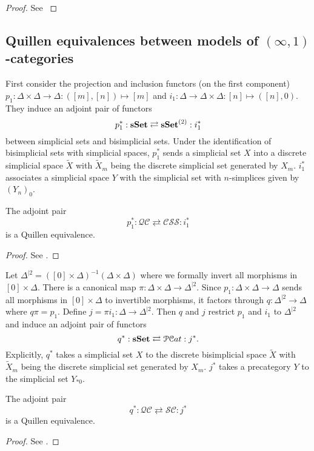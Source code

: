 \begin{refsection}
\begin{proof}
See \cite{bergner4}
\end{proof}

\subsection{Quillen equivalences between models of $(\infty,1)$-categories}

First consider the projection and inclusion functors (on the first component) $p_1:\Delta\times\Delta\to\Delta:([m],[n])\mapsto[m]$ and $i_1:\Delta\to\Delta\times\Delta:[n]\mapsto([n],0)$. They induce an adjoint pair of functors
$$p_1^*:\mathbf{sSet}\rightleftarrows\mathbf{sSet}^{(2)}:i_1^*$$
between simplicial sets and bisimplicial sets. Under the identification of bisimplicial sets with simplicial spaces, $p_1^*$ sends a simplicial set $X$ into a discrete simplicial space $\tilde X$ with $\tilde X_m$ being the discrete simplicial set generated by $X_m$. $i_1^*$ associates a simplicial space $Y$ with the simplicial set with $n$-simplices given by $(Y_n)_0$.

\begin{thm}
The adjoint pair
$$p_1^*:\mathcal{QC}\rightleftarrows\mathcal{CSS}:i_1^*$$
is a Quillen equivalence.
\end{thm}

\begin{proof}
See \cite{jt}.
\end{proof}

Let $\Delta^{|2}=([0]\times\Delta)^{-1}(\Delta\times\Delta)$ where we formally invert all morphisms in $[0]\times\Delta$. There is a canonical map $\pi:\Delta\times\Delta\to\Delta^{|2}$. Since $p_1:\Delta\times\Delta\to\Delta$ sends all morphisms in $[0]\times\Delta$ to invertible morphisms, it factors through $q:\Delta^{|2}\to\Delta$ where $q\pi=p_1$. Define $j=\pi i_1:\Delta\to\Delta^{|2}$. Then $q$ and $j$ restrict $p_1$ and $i_1$ to $\Delta^{|2}$ and induce an adjoint pair of functors
$$q^*:\mathbf{sSet}\rightleftarrows\mathcal{PC}at:j^*.$$
Explicitly, $q^*$ takes a simplicial set $X$ to the discrete bisimplicial space $\tilde X$ with $\tilde X_m$ being the discrete simplicial set generated by $X_m$. $j^*$ takes a precategory $Y$ to the simplicial set $Y_{*0}$.

\begin{thm}
The adjoint pair
$$q^*:\mathcal{QC}\rightleftarrows\mathcal{SC}:j^*$$
is a Quillen equivalence.
\end{thm}
\begin{proof}
See \cite{jt}.
\end{proof}


\end{refsection}
